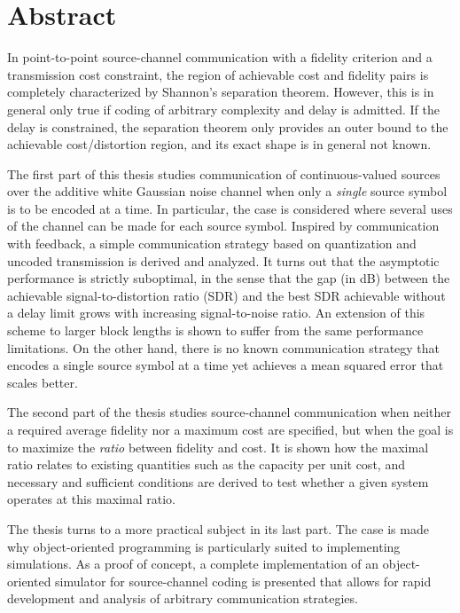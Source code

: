 \chapter*{Abstract}
\nocite{KleinerR2009a}



In point-to-point source-channel communication with a fidelity criterion and a transmission cost constraint, the region of achievable cost and fidelity pairs is completely characterized by Shannon's separation theorem. However, this is in general only true if coding of arbitrary complexity and delay is admitted. If the delay is constrained, the separation theorem only provides an outer bound to the achievable cost\slash distortion region, and its exact shape is in general not known.

The first part of this thesis studies communication of continuous-valued sources over the additive white Gaussian noise channel when only a \emph{single} source symbol is to be encoded at a time. In particular, the case is considered where several uses of the channel can be made for each source symbol. Inspired by communication with feedback, a simple communication strategy based on quantization and uncoded transmission is derived and analyzed. It turns out that the asymptotic performance is strictly suboptimal, in the sense that the gap (in dB) between the achievable signal-to-distortion ratio (SDR) and the best SDR achievable without a delay limit grows with increasing signal-to-noise ratio. An extension of this scheme to larger block lengths is shown to suffer from the same performance limitations. On the other hand, there is no known communication strategy that encodes a single source symbol at a time yet achieves a mean squared error that scales better. 

The second part of the thesis studies source-channel communication when neither a required average fidelity nor a maximum cost are specified, but when the goal is to maximize the \emph{ratio} between fidelity and cost. It is shown how the maximal ratio relates to existing quantities such as the capacity per unit cost, and necessary and sufficient conditions are derived to test whether a given system operates at this maximal ratio. 

The thesis turns to a more practical subject in its last part. The case is made why object-oriented programming is particularly suited to implementing simulations. As a proof of concept, a complete implementation of an object-oriented simulator for source-channel coding is presented that allows for rapid development and analysis of arbitrary communication strategies.
